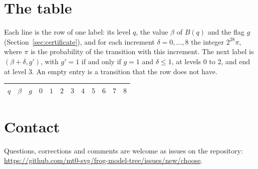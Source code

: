 \documentclass[11pt]{amsart}
\newcommand{\repo}{https://github.com/mt0-svg/frog-model-tree}
\theoremstyle{definition}
\numberwithin{equation}{section}
\newcommand{\computed}[1]{\ignorespaces}
\begin{document}
\appendix
\section{The table}\label{app:table}\computed{code/gp/table_tex.gp, paper/table.tex, code/certificate/table.cert}
Each line is the row of one label: its level $q$, the value $\beta$ of $B(q)$ and the flag $g$ (Section~\ref{sec:certificate}), and for each increment $\delta=0,\dots,8$ the integer $2^{28}\pi$, where $\pi$ is the probability of the transition with this increment. The next label is $(\beta+\delta,g')$, with $g'=1$ if and only if $g=1$ and $\delta\le1$, at levels $0$ to $2$, and $\mathrm{end}$ at level $3$. An empty entry is a transition that the row does not have.

{\small
\begin{longtable}{rrr|rrrrrrrrr}
$q$ & $\beta$ & $g$ & $0$ & $1$ & $2$ & $3$ & $4$ & $5$ & $6$ & $7$ & $8$\\ \hline
\endhead

\end{longtable}
}

\section*{Contact}
Questions, corrections and comments are welcome as issues on the repository: \url{\repo/issues/new/choose}.



\end{document}
